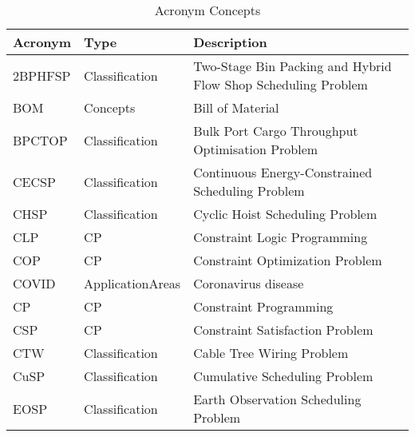 {\scriptsize
\begin{longtable}{llp{12cm}}
\caption{Acronym Concepts}\\ \toprule
Acronym & Type & Description\\ \midrule\endhead
\bottomrule
\endfoot
\index{2BPHFSP (Two-Stage Bin Packing and Hybrid Flow Shop Scheduling Problem)}\index{Two-Stage Bin Packing and Hybrid Flow Shop Scheduling Problem (2BPHFSP)}2BPHFSP & Classification & Two-Stage Bin Packing and Hybrid Flow Shop Scheduling Problem\\
\index{BOM (Bill of Material)}\index{Bill of Material (BOM)}BOM & Concepts & Bill of Material\\
\index{BPCTOP (Bulk Port Cargo Throughput Optimisation Problem)}\index{Bulk Port Cargo Throughput Optimisation Problem (BPCTOP)}BPCTOP & Classification & Bulk Port Cargo Throughput Optimisation Problem\\
\index{CECSP (Continuous Energy-Constrained Scheduling Problem)}\index{Continuous Energy-Constrained Scheduling Problem (CECSP)}CECSP & Classification & Continuous Energy-Constrained Scheduling Problem\\
\index{CHSP (Cyclic Hoist Scheduling Problem)}\index{Cyclic Hoist Scheduling Problem (CHSP)}CHSP & Classification & Cyclic Hoist Scheduling Problem\\
\index{CLP (Constraint Logic Programming)}\index{Constraint Logic Programming (CLP)}CLP & CP & Constraint Logic Programming\\
\index{COP (Constraint Optimization Problem)}\index{Constraint Optimization Problem (COP)}COP & CP & Constraint Optimization Problem\\
\index{COVID (Coronavirus disease)}\index{Coronavirus disease (COVID)}COVID & ApplicationAreas & Coronavirus disease\\
\index{CP (Constraint Programming)}\index{Constraint Programming (CP)}CP & CP & Constraint Programming\\
\index{CSP (Constraint Satisfaction Problem)}\index{Constraint Satisfaction Problem (CSP)}CSP & CP & Constraint Satisfaction Problem\\
\index{CTW (Cable Tree Wiring Problem)}\index{Cable Tree Wiring Problem (CTW)}CTW & Classification & Cable Tree Wiring Problem\\
\index{CuSP (Cumulative Scheduling Problem)}\index{Cumulative Scheduling Problem (CuSP)}CuSP & Classification & Cumulative Scheduling Problem\\
\index{EOSP (Earth Observation Scheduling Problem)}\index{Earth Observation Scheduling Problem (EOSP)}EOSP & Classification & Earth Observation Scheduling Problem\\

\end{longtable}}
